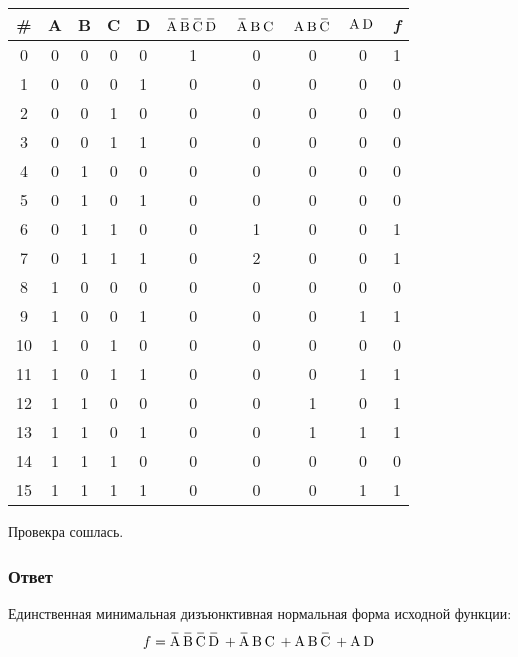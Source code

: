 \documentclass[a4paper, 14pt]{extarticle}
\begin{document}
\begin{table}[h!]
  \centering
  \setlength{\arrayrulewidth}{0.5mm}
  \setlength{\tabcolsep}{20pt}
  \renewcommand{\arraystretch}{1.5}
  \begin{adjustbox}{max width=1\textwidth}
    \begin{tabular}{|c|c|c|c|c|c|c|c|c|c|}
    \hline
    \rowcolor{gray!50}
    \# & \bfseries A & \bfseries B & \bfseries C & \bfseries D & 
    $\OV{A}\OV{B}\OV{C}\OV{D}$ & $\OV{A}\NOV{B}\NOV{C}$ & $\NOV{A}\NOV{B}\OV{C}$ & 
    $\text{A} \hspace{2pt}\text{D} \hspace{2pt}$ & \bfseries \itshape f \\
    \hline
    0 & 0 & 0 & 0 & 0 & 1 & 0 & 0 & 0 & 1 \\
    \hline
    1 & 0 & 0 & 0 & 1 & 0& 0&0&0 & 0 \\
    \hline
    2 & 0 & 0 & 1 & 0 & 0&0&0&0 & 0 \\
    \hline
    3 & 0 & 0 & 1 & 1 & 0&0&0&0 & 0 \\
    \hline
    4 & 0 & 1 & 0 & 0 & 0&0&0&0 & 0 \\
    \hline
    5 & 0 & 1 & 0 & 1 & 0&0&0&0 & 0 \\
    \hline
    6 & 0 & 1 & 1 & 0 & 0&1&0&0 & 1 \\
    \hline
    7 & 0 & 1 & 1 & 1 & 0&2&0&0 & 1 \\
    \hline
    8 & 1 & 0 & 0 & 0 & 0&0&0&0 & 0 \\
    \hline
    9 & 1 & 0 & 0 & 1 & 0&0&0&1 & 1 \\
    \hline
    10 & 1 & 0 & 1 & 0 & 0&0&0&0 & 0 \\
    \hline
    11 & 1 & 0 & 1 & 1 & 0&0&0&1 & 1 \\
    \hline
    12 & 1 & 1 & 0 & 0 & 0&0&1&0 & 1 \\
    \hline
    13 & 1 & 1 & 0 & 1 & 0&0&1&1 & 1 \\
    \hline
    14 & 1 & 1 & 1 & 0 & 0&0&0&0 & 0 \\
    \hline
    15 & 1 & 1 & 1 & 1 & 0&0&0&1 & 1 \\
    \hline
    \end{tabular}
  \end{adjustbox}
\end{table}

Провекра сошлась.

\subsubsection{Ответ}

Единственная минимальная дизъюнктивная нормальная форма исходной функции:
\begin{equation*}
  f = \OV{A}\OV{B}\OV{C}\OV{D} + \OV{A}\NOV{B}\NOV{C} + \NOV{A}\NOV{B}\OV{C} +
  \NOV{A}\NOV{D}
\end{equation*}
\end{document}
